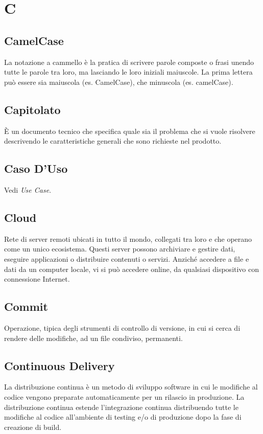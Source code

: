 \section*{C}

\subsection{CamelCase}
La notazione a cammello è la pratica di scrivere parole composte o frasi unendo tutte le parole tra loro, ma lasciando le loro iniziali maiuscole. La prima lettera può essere sia maiuscola (es. CamelCase), che minuscola (es. camelCase).

\subsection{Capitolato}
È un documento tecnico che specifica quale sia il problema che si vuole risolvere descrivendo le caratteristiche generali che sono richieste nel prodotto.

\subsection{Caso D'Uso}
Vedi \textit{Use Case}.

\subsection{Cloud}
Rete di server remoti ubicati in tutto il mondo, collegati tra loro e che operano come un unico ecosistema. Questi server possono archiviare e gestire dati, eseguire applicazioni o distribuire contenuti o servizi. Anziché accedere a file e dati da un computer locale, vi si può accedere online, da qualsiasi dispositivo con connessione Internet.

\subsection{Commit}
Operazione, tipica degli strumenti di controllo di versione, in cui si cerca di rendere delle modifiche, ad un file condiviso, permanenti.

\subsection{Continuous Delivery}
La distribuzione continua è un metodo di sviluppo software in cui le modifiche al codice vengono preparate automaticamente per un rilascio in produzione. La distribuzione continua estende l'integrazione continua distribuendo tutte le modifiche al codice all'ambiente di testing e/o di produzione dopo la fase di creazione di build.

